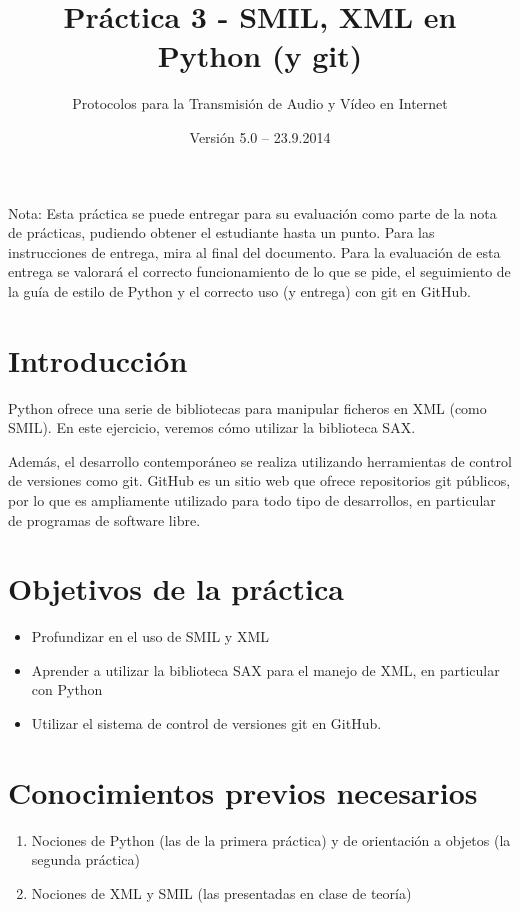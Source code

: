 \documentclass[11pt,a4paper]{article}
\begin{document}
\title{Práctica 3 - SMIL, XML en Python (y git)}
\author{Protocolos para la Transmisión de Audio y Vídeo en Internet}
\date{Versión 5.0 – 23.9.2014}


\maketitle


Nota: Esta práctica se puede entregar para su evaluación como parte de la nota de prácticas, pudiendo obtener el estudiante hasta un punto. Para las instrucciones de entrega, mira al final del documento. Para la evaluación de esta entrega se valorará el correcto funcionamiento de lo que se pide, el seguimiento de la guía de estilo de Python y el correcto uso (y entrega) con git en GitHub.

\section{Introducción}

Python ofrece una serie de bibliotecas para manipular ficheros en XML (como SMIL). En este ejercicio, veremos cómo utilizar la biblioteca SAX.

Además, el desarrollo contemporáneo se realiza utilizando herramientas de control de versiones como git. GitHub es un sitio web que ofrece repositorios git públicos, por lo que es ampliamente utilizado para todo tipo de desarrollos, en particular de programas de software libre.

\section{Objetivos de la práctica}

\begin{itemize}
  \item Profundizar en el uso de SMIL y XML
  \item Aprender a utilizar la biblioteca SAX para el manejo de XML, en particular con Python
  \item Utilizar el sistema de control de versiones git en GitHub.
\end{itemize}

\section{Conocimientos previos necesarios}

\begin{enumerate}
  \item Nociones de Python (las de la primera práctica) y de orientación a objetos (la segunda práctica)
  \item Nociones de XML y SMIL (las presentadas en clase de teoría)
\end{enumerate}
\end{document}
